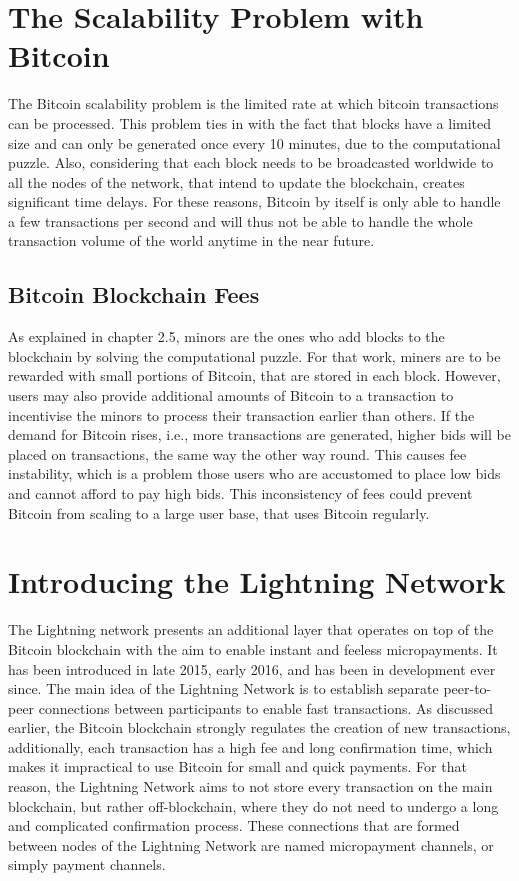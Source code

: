 \documentclass[a4paper, 12pt]{report}
\begin{document}
\chapter{The Scalability Problem with Bitcoin}

\par The Bitcoin scalability problem is the limited rate at which bitcoin transactions can be processed. This problem ties in with the fact that blocks have a limited size and can only be generated once every 10 minutes, due to the computational puzzle. Also, considering that each block needs to be broadcasted worldwide to all the nodes of the network, that intend to update the blockchain, creates significant time delays. For these reasons, Bitcoin by itself is only able to handle a few transactions per second and will thus not be able to handle the whole transaction volume of the world anytime in the near future.

\section{Bitcoin Blockchain Fees}

\par As explained in chapter 2.5, minors are the ones who add blocks to the blockchain by solving the computational puzzle. For that work, miners are to be rewarded with small portions of Bitcoin, that are stored in each block. However, users may also provide additional amounts of Bitcoin to a transaction to incentivise the minors to process their transaction earlier than others. If the demand for Bitcoin rises, i.e., more transactions are generated, higher bids will be placed on transactions, the same way the other way round. This causes fee instability, which is a problem those users who are accustomed to place low bids and cannot afford to pay high bids. This inconsistency of fees could prevent Bitcoin from scaling to a large user base, that uses Bitcoin regularly.

\chapter{Introducing the Lightning Network}

\par The Lightning network presents an additional layer that operates on top of the Bitcoin blockchain with the aim to enable instant and feeless micropayments. It has been introduced in late 2015, early 2016, and has been in development ever since. The main idea of the Lightning Network is to establish separate peer-to-peer connections between participants to enable fast transactions. As discussed earlier, the Bitcoin blockchain strongly regulates the creation of new transactions, additionally, each transaction has a high fee and long confirmation time, which makes it impractical to use Bitcoin for small and quick payments. For that reason, the Lightning Network aims to not store every transaction on the main blockchain, but rather off-blockchain, where they do not need to undergo a long and complicated confirmation process. These connections that are formed between nodes of the Lightning Network are named micropayment channels, or simply payment channels.
\end{document}
